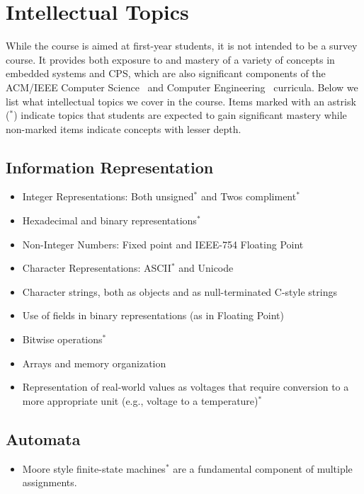 \section{Intellectual Topics}
\label{sec:topics}

While the course is aimed at first-year students,
it is not intended to be a survey course.
It provides both exposure to and mastery of a variety of concepts
in embedded systems and CPS, which are also significant components
of the ACM/IEEE
Computer Science~\cite{cs13} and Computer Engineering~\cite{ce16} curricula.
Below we list what intellectual topics we cover in the course.
Items marked with an astrisk ($^*$)
indicate topics that students are expected to gain significant mastery
while non-marked items indicate concepts with lesser depth.

\subsection{Information Representation}
\label{sec:ip}
\begin{itemize}
  \item Integer Representations: Both unsigned$^*$ and Twos compliment$^*$
  \item Hexadecimal and binary representations$^*$
  \item Non-Integer Numbers: Fixed point and IEEE-754 Floating Point
  \item Character Representations: ASCII$^*$ and Unicode
  \item Character strings, both as objects and as null-terminated C-style strings
  \item Use of fields in binary representations (as in Floating Point)
  \item Bitwise operations$^*$
  \item Arrays and memory organization
  \item Representation of real-world values as voltages that require conversion to a more appropriate unit (e.g., voltage to a temperature)$^*$
\end{itemize}

\subsection{Automata}
\label{sec:fsm}
\begin{itemize}
\item Moore style finite-state machines$^*$ are a fundamental component of multiple assignments.
\end{itemize}

